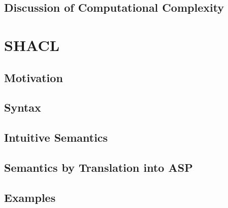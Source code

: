 \documentclass[12pt]{extarticle}
\begin{document}
\subsection{Discussion of Computational Complexity}

\section{SHACL}
\label{sec:shacl}

\subsection{Motivation}

\subsection{Syntax}

\subsection{Intuitive Semantics}

\subsection{Semantics by Translation into ASP}

\subsection{Examples}
\end{document}

